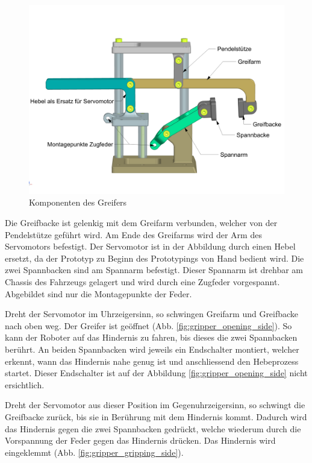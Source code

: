 \begin{figure}[H]
\centering
\includegraphics[width=1.0\linewidth]{assets/greifer-prototyp/Greifer_side_Komponentennamen.png} 
\caption{Komponenten des Greifers}
\label{fig:gripper_components}
\end{figure}

Die Greifbacke ist gelenkig mit dem Greifarm verbunden, welcher von der Pendelstütze geführt wird. Am Ende des Greifarms wird der Arm des Servomotors befestigt. Der Servomotor ist in der Abbildung durch einen Hebel ersetzt, da der Prototyp zu Beginn des Prototypings von Hand bedient wird. Die zwei Spannbacken sind am Spannarm befestigt. Dieser Spannarm ist drehbar am Chassis des Fahrzeugs gelagert und wird durch eine Zugfeder vorgespannt. Abgebildet sind nur die Montagepunkte der Feder.

\newpage

Dreht der Servomotor im Uhrzeigersinn, so schwingen Greifarm und Greifbacke nach oben weg. Der Greifer ist geöffnet (Abb. \ref{fig:gripper_opening_side}). So kann der Roboter auf das Hindernis zu fahren, bis dieses die zwei Spannbacken berührt. An beiden Spannbacken wird jeweils ein Endschalter montiert, welcher erkennt, wann das Hindernis nahe genug ist und anschliessend den Hebeprozess startet. Dieser Endschalter ist auf der Abbildung \ref{fig:gripper_opening_side} nicht ersichtlich.

Dreht der Servomotor aus dieser Position im Gegenuhrzeigersinn, so schwingt die Greifbacke zurück, bis sie in Berührung mit dem Hindernis kommt. Dadurch wird das Hindernis gegen die zwei Spannbacken gedrückt, welche wiederum durch die Vorspannung der Feder gegen das Hindernis drücken. Das Hindernis wird eingeklemmt (Abb. \ref{fig:gripper_gripping_side}).

